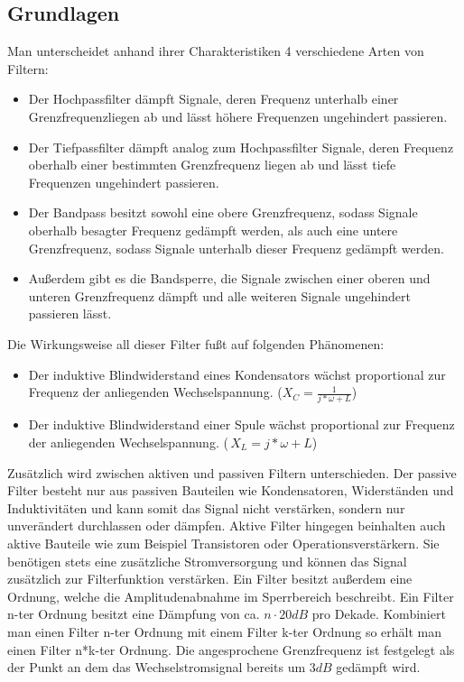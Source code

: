 \subsection{Grundlagen}
Man unterscheidet anhand ihrer Charakteristiken 4 verschiedene Arten von Filtern:
\begin{itemize}
\item Der Hochpassfilter dämpft Signale, deren Frequenz unterhalb einer Grenzfrequenzliegen ab und lässt höhere Frequenzen ungehindert passieren.\cite{skript}
\item Der Tiefpassfilter dämpft analog zum Hochpassfilter Signale, deren Frequenz oberhalb einer bestimmten Grenzfrequenz liegen ab und lässt tiefe Frequenzen ungehindert passieren.\cite{skript}
\item Der Bandpass besitzt sowohl eine obere Grenzfrequenz, sodass Signale oberhalb besagter Frequenz gedämpft werden, als auch eine untere Grenzfrequenz, sodass Signale unterhalb dieser Frequenz gedämpft werden.\cite{skript}
\item Außerdem gibt es die Bandsperre, die Signale zwischen einer oberen und unteren Grenzfrequenz dämpft und alle weiteren Signale ungehindert passieren lässt.\cite{skript}
\end{itemize}
Die Wirkungsweise all dieser Filter fußt auf folgenden Phänomenen:
\begin{itemize}
\item Der induktive Blindwiderstand eines Kondensators wächst proportional zur Frequenz der anliegenden Wechselspannung. ($X_{C}=\frac{1}{j*\omega+L}$) \cite{IBK}
\item Der induktive Blindwiderstand einer Spule wächst proportional zur Frequenz der anliegenden Wechselspannung. ($\,X_{L}=j*\omega+L$) \cite{IBS}
\end{itemize}
Zusätzlich wird zwischen aktiven und passiven Filtern unterschieden. Der passive Filter besteht nur aus passiven Bauteilen wie Kondensatoren, Widerständen und Induktivitäten und kann somit das Signal nicht verstärken, sondern nur unverändert durchlassen oder dämpfen. 
Aktive Filter hingegen beinhalten auch aktive Bauteile wie zum Beispiel Transistoren oder Operationsverstärkern. Sie benötigen stets eine zusätzliche Stromversorgung und können das Signal zusätzlich zur Filterfunktion verstärken.
\newline Ein Filter besitzt außerdem eine Ordnung, welche die Amplitudenabnahme im Sperrbereich beschreibt. Ein Filter n-ter Ordnung besitzt eine Dämpfung von ca. $n\cdot\si{20}{dB}$ pro Dekade. Kombiniert man einen Filter n-ter Ordnung mit einem Filter k-ter Ordnung so erhält man einen Filter n*k-ter Ordnung. \cite{DSV} \cite{filter}
\newline Die angesprochene Grenzfrequenz ist festgelegt als der Punkt an dem das Wechselstromsignal bereits um $\si{3}{dB}$ gedämpft wird.

